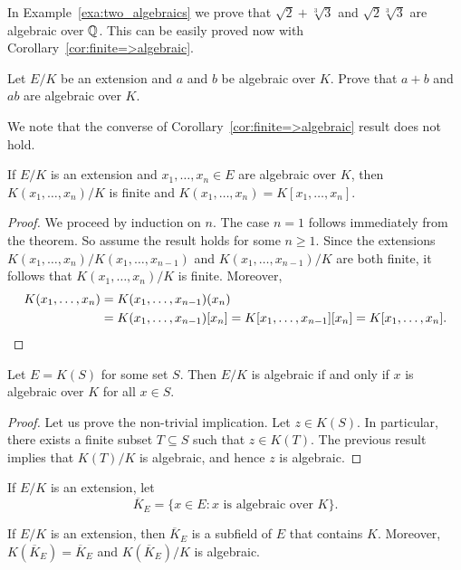In Example~\ref{exa:two_algebraics} we 
prove that $\sqrt{2}+\sqrt[3]{3}$ and $\sqrt{2}\sqrt[3]{3}$ 
are algebraic over $\mathbb{Q}$. This can be easily proved
now with Corollary~\ref{cor:finite=>algebraic}. 

\begin{exercise}
\label{xca:algebraic}
    Let $E/K$ be an extension and 
    $a$ and $b$ be algebraic over $K$. Prove 
    that $a+b$ and $ab$ are algebraic over $K$. 
\end{exercise}

We note that the converse of Corollary~\ref{cor:finite=>algebraic} result does not hold. 

\begin{corollary}
	If $E/K$ is an extension and $x_1,\dots,x_n\in E$ 
	are algebraic over $K$, then 
	$K(x_1,\dots,x_n)/K$ is finite and
	$K(x_1,\dots,x_n)=K[x_1,\dots,x_n]$. 
\end{corollary}

\begin{proof}
	We proceed by induction on $n$. The case $n=1$ follows immediately from 
	the theorem. So assume the result holds for some $n\geq1$. Since the extensions 
	$K(x_1,\dots,x_n)/K(x_1,\dots,x_{n-1})$ and $K(x_1,\dots,x_{n-1})/K$ are
	both finite, it follows that $K(x_1,\dots,x_n)/K$ is finite. Moreover, 
	\begin{align*}
	K(x_1,\dots,x_n)&=K(x_1,\dots,x_{n-1})(x_n)\\
	&=K(x_1,\dots,x_{n-1})[x_n]=K[x_1,\dots,x_{n-1}][x_n]=K[x_1,\dots,x_n].\qedhere
    \end{align*}
\end{proof}

\begin{corollary}
	Let $E=K(S)$ for some set $S$. Then $E/K$ is algebraic if and only if
	$x$ is algebraic over $K$ for all $x\in S$. 
\end{corollary}

\begin{proof}
	Let us prove the non-trivial implication. Let $z\in K(S)$. In particular, 
	there exists a finite subset $T\subseteq S$ such that 
	$z\in K(T)$. The previous result implies that $K(T)/K$ is algebraic, and
	hence $z$ is algebraic. 
\end{proof}

If $E/K$ is an extension, let 
\[
	\overline{K}_E=\{x\in E:x\text{ is algebraic over }K\}. 
\]

\begin{corollary}
	If $E/K$ is  an extension, then $\overline{K}_E$ 
	is a subfield of $E$ that contains $K$. Moreover, 
	$K(\overline{K}_E)=\overline{K}_E$ and 
        $K(\overline{K}_E)/K$ is algebraic. 
\end{corollary}	

